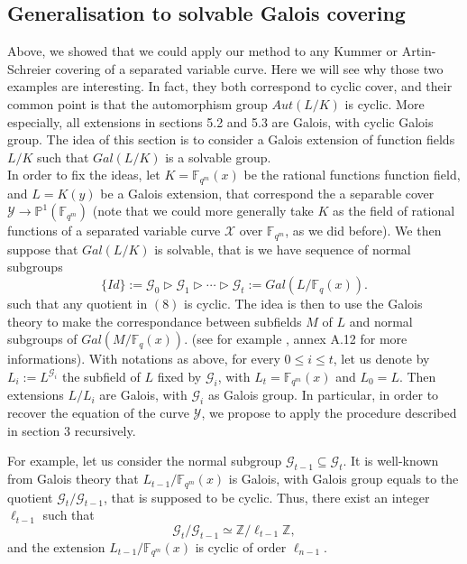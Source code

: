 \documentclass[10pt]{article}
\newcommand{\s}{\vspace{0.3cm}}
\newcommand{\Z}{\mathbb{Z}}
\newcommand{\fqm}{\mathbb{F}_{q^m}}
\newcommand{\fq}{\mathbb{F}_q}
\newcommand{\su}{\subseteq}
\newcommand{\X}{\mathcal{X}}
\newcommand{\Y}{\mathcal{Y}}
\newcommand{\G}{\mathcal{G}}
\begin{document}
\s

\subsection{Generalisation to solvable Galois covering}

\s

Above, we showed that we could apply our method to any Kummer or Artin-Schreier covering of a separated variable curve. Here we will see why those two examples are interesting. In fact, they both correspond to cyclic cover, and their common point is that the automorphism group $Aut(L/K)$ is cyclic. More especially, all extensions in sections 5.2 and 5.3 are Galois, with cyclic Galois group. The idea of this section is to consider a Galois extension of function fields $L/K$ such that $Gal(L/K)$ is a solvable group. \\
In order to fix the ideas, let $K=\fqm(x)$ be the rational functions function field, and $L=K(y)$ be a Galois extension, that correspond the a separable cover $\Y \rightarrow \mathbb{P}^1(\fqm)$ (note that we could more generally take $K$ as the field of rational functions of a separated variable curve $\X$ over $\fqm$, as we did before). We then suppose that $Gal(L/K)$ is solvable, that is we have sequence of normal subgroups
\begin{equation}
 \{Id\} := \G_0 \triangleright \G_1 \triangleright \cdots \triangleright \G_t := Gal(L/\fq(x)). 
\end{equation} 
such that any quotient in $(8)$ is cyclic.
The idea is then to use the Galois theory to make the correspondance between subfields $M$ of $L$ and normal subgroups of $Gal(M/\fq(x))$. (see for example \cite{Sti}, annex A.12 for more informations). 
With notations as above, for every $0 \leq i \leq t$, let us denote by $L_i := L^{\G_i}$ the subfield of $L$ fixed by $\G_i$, with $L_t=\fqm(x)$ and $L_0=L$. Then  extensions $L/L_i$ are Galois, with $\G_i$ as Galois group. In particular, in order to recover the equation of the curve $\Y$, we propose to apply the procedure described in section 3 recursively. 

 \s
 
For example, let us consider the normal subgroup $\G_{t-1} \su \G_t$. It is well-known from Galois theory that $L_{t-1}/\fqm(x)$ is Galois, with Galois group equals to the quotient $\G_t/\G_{t-1}$, that is supposed to be cyclic. Thus, there exist an integer $\ell_{t-1}$ such that 
\[ \G_t/\G_{t-1} \simeq \Z/\ell_{t-1}\Z,\] 
and the extension $L_{t-1}/\fqm(x)$ is cyclic of order $\ell_{n-1}$. 
\end{document}
